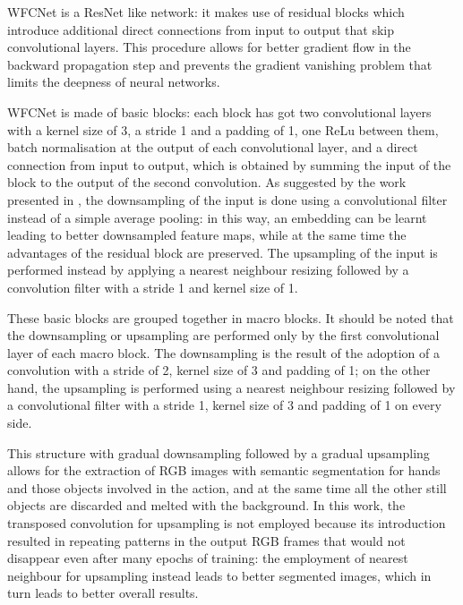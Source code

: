 \documentclass[10pt,twocolumn,letterpaper]{article}
\begin{document}
WFCNet is a ResNet like network: it makes use of residual blocks which introduce additional direct connections from input to output that skip convolutional layers. This procedure allows for better gradient flow in the backward propagation step and prevents the gradient vanishing problem that limits the deepness of neural networks.

WFCNet is made of basic blocks: each block has got two convolutional layers with a kernel size of 3, a stride 1 and a padding of 1, one ReLu between them, batch normalisation at the output of each convolutional layer, and a direct connection from input to output, which is obtained by summing the input of the block to the output of the second convolution.
As suggested by the work presented in \cite{springenberg2014striving}, the downsampling of the input is done using a convolutional filter instead of a simple average pooling: in this way, an embedding can be learnt leading to better downsampled feature maps, while at the same time the advantages of the residual block are preserved.
The upsampling of the input is performed instead by applying a nearest neighbour resizing followed by a convolution filter with a stride 1 and kernel size of 1.

These basic blocks are grouped together in macro blocks. It should be noted that the downsampling or upsampling are performed only by the first convolutional layer of each macro block. The downsampling is the result of the adoption of a convolution with a stride of 2, kernel size of 3 and padding of 1; on the other hand, the upsampling is performed using a nearest neighbour resizing followed by a convolutional filter with a stride 1, kernel size of 3 and padding of 1 on every side. 

This structure with gradual downsampling followed by a gradual upsampling allows for the extraction of RGB images with semantic segmentation for hands and those objects involved in the action, and at the same time all the other still objects are discarded and melted with the background. In this work, the transposed convolution for upsampling is not employed because its introduction resulted in repeating patterns in the output RGB frames that would not disappear even after many epochs of training: the employment of nearest neighbour for upsampling instead leads to better segmented images, which in turn leads to better overall results.
\end{document}

